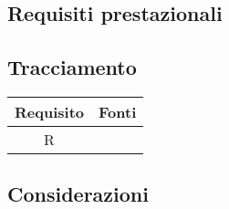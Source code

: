 \subsection{Requisiti prestazionali}

\subsection{Tracciamento}
\begin{center}
	\begin{longtable}{|c|c|}
		\hline
		\rowcolor{lighter-grayer}
		\textbf{Requisito} &  \textbf{Fonti}  \\
		\hline
		\endfirsthead
		
		 R & \\
		\hline
		
	\end{longtable}
\end{center}
\subsection{Considerazioni}